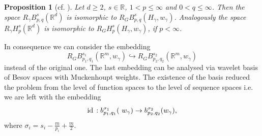 \documentclass[12pt]{article}
\newtheorem{Prop}{Proposition}
\def\id{\mathop{\rm id \,}\nolimits}
\newcommand{\Rd}{{\mathbb R}^{d}}
\newcommand{\R}{{\mathbb R}}
\begin{document}
\begin{Prop}[cf. \cite{DS}]
	\label{anfang3}
	Let $d\ge 2$, $s\in \R$, $1 < p \le \infty$ and $0<q \le \infty$.  Then the space 
	$R_{\gamma} B^s_{p,q}(\Rd)$ is isomorphic to  $R_{G} B^s_{p,q} (H_\gamma,  w_\gamma)$.  Analogously the space  
	$R_{\gamma} H^s_p (\Rd)$ is isomorphic to $R_{G}H^s_p (H_\gamma,  w_\gamma)$, if $p<\infty$. 
\end{Prop}

In consequence  we can consider the embedding
\[ R_{G} B^{s_1}_{p_1,q_1} (\R^m,  w_\gamma)\hookrightarrow R_{G} B^{s_2}_{p_2,q_2} (\R^m,  w_\gamma)\]
instead of the original one. The last embedding can be analysed via  wavelet basis of Besov spaces with Muckenhoupt weights. The existence  of the basis reduced the problem from the level of  function spaces to the level of sequence spaces  i.e. we are left with the embedding 
\[ \id:b^{\sigma_1}_{p_1,q_1}(\ w_\gamma)\rightarrow  b^{\sigma_2}_{p_2,q_2}( w_\gamma), 
 \]
where $\sigma_i=s_i-\frac{m}{p_i}+\frac{m}{2}$. 
\end{document}
